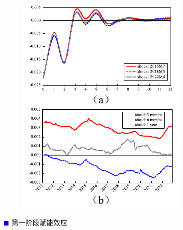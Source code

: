 \documentclass[12pt,aspectratio=169]{ctexbeamer}
\begin{document}
			\begin{frame}
				\frametitle{}
				\begin{figure}
					\centering
					\vspace{-5mm}
					\includegraphics[height=0.7\textheight]{figures/fig.5-5}
				\end{figure}
					\vspace{-3mm}
					\textcolor{blue}{\footnotesize $\blacksquare$} \large 第一阶段赋能效应\\
					\hspace{1em}

\end{frame}
\end{document}
